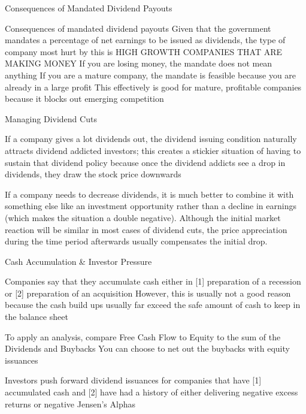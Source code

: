 \documentclass[10pt]{article}
\begin{document}
    \begin{core}{Consequences of Mandated Dividend Payouts}

      Consequences of mandated dividend payouts
      Given that the government mandates a percentage of net earnings to be issued as dividends, the type of company most hurt by this is HIGH GROWTH COMPANIES THAT ARE MAKING MONEY
      If you are losing money, the mandate does not mean anything
      If you are a mature company, the mandate is feasible because you are already in a large profit
      This effectively is good for mature, profitable companies because it blocks out emerging competition

    \end{core}

    \begin{core}{Managing Dividend Cuts}

      If a company gives a lot dividends out, the dividend issuing condition naturally attracts dividend addicted investors; this creates a stickier situation of having to sustain that dividend policy because once the dividend addicts see a drop in dividends, they draw the stock price downwards

      If a company needs to decrease dividends, it is much better to combine it with something else like an investment opportunity rather than a decline in earnings (which makes the situation a double negative). Although the initial market reaction will be similar in most cases of dividend cuts, the price appreciation during the time period afterwards usually compensates the initial drop.

    \end{core}

    \begin{core}{Cash Accumulation \& Investor Pressure}

      Companies say that they accumulate cash either in [1] preparation of a recession or [2] preparation of an acquisition
      However, this is usually not a good reason because the cash build ups usually far exceed the safe amount of cash to keep in the balance sheet

      To apply an analysis, compare Free Cash Flow to Equity to the sum of the Dividends and Buybacks
      You can choose to net out the buybacks with equity issuances


      Investors push forward dividend issuances for companies that have [1] accumulated cash and [2] have had a history of either delivering negative excess returns or negative Jensen’s Alphas

    \end{core}
  
\end{document}
